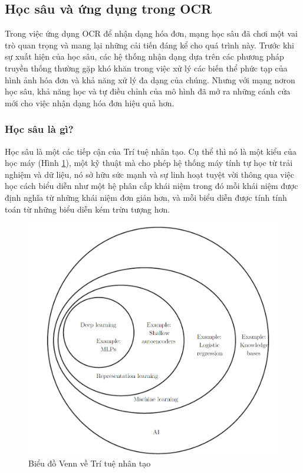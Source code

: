 \subsection{Học sâu và ứng dụng trong OCR}
Trong việc ứng dụng OCR để nhận dạng hóa đơn, mạng học sâu đã chơi một vai trò quan trọng và mang lại những cải tiến đáng kể cho quá trình này. Trước khi sự xuất hiện của học sâu, các hệ thống nhận dạng dựa trên các phương pháp truyền thống thường gặp khó khăn trong việc xử lý các biến thể phức tạp của hình ảnh hóa đơn và khả năng xử lý đa dạng của chúng. Nhưng với mạng nơron học sâu, khả năng học và tự điều chỉnh của mô hình đã mở ra những cánh cửa mới cho việc nhận dạng hóa đơn hiệu quả hơn.

\subsubsection{Học sâu là gì?}
Học sâu là một các tiếp cận của Trí tuệ nhân tạo. Cụ thể thì nó là một kiểu của học máy (Hình \ref{fig:venn1}), một kỹ thuật mà cho phép hệ thống máy tính tự học từ trải nghiệm và dữ liệu, nó sở hữu sức mạnh và sự linh hoạt tuyệt vời thông qua việc học cách biểu diễn như một hệ phân cấp khái niệm trong đó mỗi khái niệm được định nghĩa từ những khái niệm đơn giản hơn, và mỗi biểu diễn được tính tính toán từ những biểu diễn kém trừu tượng hơn. \cite{Goodfellow-et-al-2016}

\begin{figure}
    \includegraphics[scale=0.45]{images/venn_diagram_deeplearning.png}
    \centering
    \caption{Biểu đồ Venn về Trí tuệ nhân tạo}
    \label{fig:venn1}
\end{figure}

